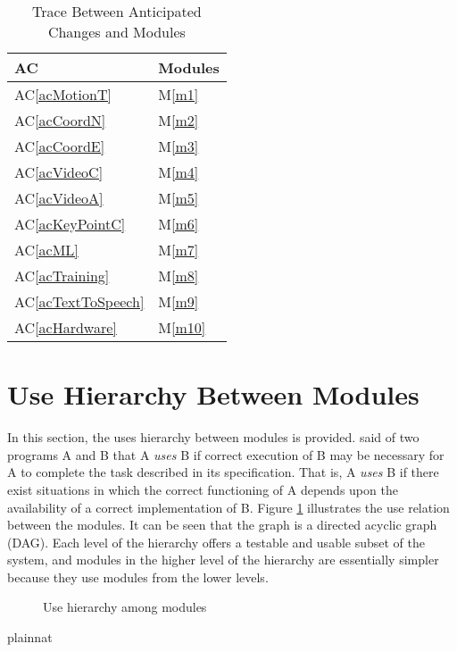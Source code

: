 \documentclass[12pt, titlepage]{article}
\newcommand{\acref}[1]{AC\ref{#1}}
\newcommand{\mref}[1]{M\ref{#1}}
\begin{document}
\begin{table}[H]
\centering
\begin{tabular}{p{} p{}}
\toprule
\textbf{AC} & \textbf{Modules}\\
\midrule
\acref{acMotionT} & \mref{m1}\\
\acref{acCoordN} & \mref{m2}\\
\acref{acCoordE} & \mref{m3}\\
\acref{acVideoC} & \mref{m4}\\
\acref{acVideoA} & \mref{m5}\\
\acref{acKeyPointC} & \mref{m6}\\
\acref{acML} & \mref{m7}\\
\acref{acTraining} & \mref{m8}\\
\acref{acTextToSpeech} & \mref{m9}\\
\acref{acHardware} & \mref{m10}\\





\bottomrule
\end{tabular}
\caption{Trace Between Anticipated Changes and Modules}
\label{TblACT}
\end{table}

\section{Use Hierarchy Between Modules} \label{SecUse}

In this section, the uses hierarchy between modules is
provided. \citet{Parnas1978} said of two programs A and B that A {\em uses} B if
correct execution of B may be necessary for A to complete the task described in
its specification. That is, A {\em uses} B if there exist situations in which
the correct functioning of A depends upon the availability of a correct
implementation of B.  Figure \ref{FigUH} illustrates the use relation between
the modules. It can be seen that the graph is a directed acyclic graph
(DAG). Each level of the hierarchy offers a testable and usable subset of the
system, and modules in the higher level of the hierarchy are essentially simpler
because they use modules from the lower levels.

\begin{figure}[H]
\centering
\caption{Use hierarchy among modules}
\label{FigUH}
\end{figure}


 {plainnat}

\end{document}
